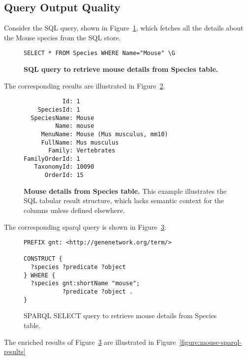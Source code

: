 \subsection{Query Output Quality}

Consider the SQL query, shown in Figure~\ref{sql:mouse}, which fetches all the details about the Mouse species from the SQL store.

\begin{figure}[H]
\centering
\begin{verbatim}
SELECT * FROM Species WHERE Name="Mouse" \G
\end{verbatim}
\caption[SQL: Fetching mouse details from Species table]{\textbf{SQL query to retrieve mouse details from Species table.}}\label{sql:mouse}
\end{figure}

The corresponding results are illustrated in Figure~\ref{sql:mouse-results}.

\begin{figure}[H]
\centering
\begin{verbatim}
           Id: 1
    SpeciesId: 1
  SpeciesName: Mouse
         Name: mouse
     MenuName: Mouse (Mus musculus, mm10)
     FullName: Mus musculus
       Family: Vertebrates
FamilyOrderId: 1
   TaxonomyId: 10090
      OrderId: 15
\end{verbatim}
\caption[SQL Results: Fetching mouse details from Species table]{\textbf{Mouse details from Species table.}  This example illustrates the SQL tabular result structure, which lacks semantic context for the columns unless defined elsewhere.}\label{sql:mouse-results}
\end{figure}

The corresponding sparql query is shown in Figure~\ref{sparql:mouse}:

\begin{figure}[H]
\centering
\begin{verbatim}
PREFIX gnt: <http://genenetwork.org/term/>

CONSTRUCT {
  ?species ?predicate ?object
} WHERE {
  ?species gnt:shortName "mouse";
           ?predicate ?object .
}
\end{verbatim}
\caption[SPARQL: Fetching mouse details]{SPARQL SELECT query to retrieve mouse details from Species table.}\label{sparql:mouse}
\end{figure}

The enriched results of Figure~\ref{sparql:mouse} are illustrated in Figure~\ref{figure:mouse-sparql-results}

